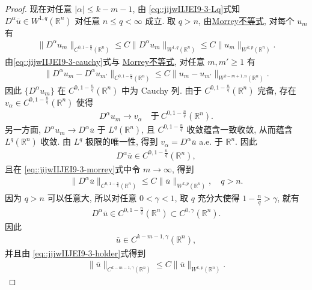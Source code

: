 \documentclass[../../main.tex]{subfiles}
\begin{document}
\begin{proof}
现在对任意 $|\alpha|\leqslant k-m-1$, 由 \eqref{eq::jijwIIJEI9-3-Lq}式知 $D^{\alpha}\overline{u}\in W^{1,q}(\mathbb{R}^{n})$ 对任意 $n\leqslant q<\infty$ 成立. 取 $q>n$, 由\hyperref[theorem:Morrey不等式]{Morrey不等式}, 对每个 $u_{m}$ 有
\begin{align}\label{eq::jijwIIJEI9-3-morrey}
\|D^{\alpha}u_{m}\|_{C^{0,1-\frac{n}{q}}(\mathbb{R}^{n})}\leqslant C\|D^{\alpha}u_{m}\|_{W^{1,q}(\mathbb{R}^{n})}\leqslant C\|u_{m}\|_{W^{k,p}(\mathbb{R}^{n})}.
\end{align}
由\eqref{eq::jijwIIJEI9-3-cauchy}式与 \hyperref[theorem:Morrey不等式]{Morrey不等式}, 对任意 $m,m'\geqslant1$ 有
\begin{align*}
\|D^{\alpha}u_{m}-D^{\alpha}u_{m'}\|_{C^{0,1-\frac{n}{q}}(\mathbb{R}^{n})}\leqslant C\|u_{m}-u_{m'}\|_{W^{k-m+1,n}(\mathbb{R}^{n})}.
\end{align*}
因此 $\{D^{\alpha}u_{m}\}$ 在 $C^{0,1-\frac{n}{q}}(\mathbb{R}^{n})$ 中为 Cauchy 列. 由于 $C^{0,1-\frac{n}{q}}(\mathbb{R}^{n})$ 完备, 存在 $v_{\alpha}\in C^{0,1-\frac{n}{q}}(\mathbb{R}^{n})$ 使得
\begin{align*}
D^{\alpha}u_{m}\to v_{\alpha}\quad\text{于}\ C^{0,1-\frac{n}{q}}(\mathbb{R}^{n}).
\end{align*}
另一方面, $D^{\alpha}u_{m}\to D^{\alpha}\overline{u}$ 于 $L^{q}(\mathbb{R}^{n})$, 且 $C^{0,1-\frac{n}{q}}$ 收敛蕴含一致收敛, 从而蕴含 $L^{q}(\mathbb{R}^{n})$ 收敛. 由 $L^{q}$ 极限的唯一性, 得到 $v_{\alpha}=D^{\alpha}\overline{u}$ a.e. 于 $\mathbb{R}^{n}$. 因此
\begin{align*}
D^{\alpha}\overline{u}\in C^{0,1-\frac{n}{q}}(\mathbb{R}^{n}),
\end{align*}
且在 \eqref{eq::jijwIIJEI9-3-morrey}式中令 $m\to\infty$, 得到
\begin{align}\label{eq::jijwIIJEI9-3-holder}
\|D^{\alpha}\overline{u}\|_{C^{0,1-\frac{n}{q}}(\mathbb{R}^{n})}\leqslant C\|\overline{u}\|_{W^{k,p}(\mathbb{R}^{n})},\quad q>n.
\end{align}
因为 $q>n$ 可以任意大, 所以对任意 $0<\gamma<1$, 取 $q$ 充分大使得 $1-\frac{n}{q}>\gamma$, 就有
\begin{align*}
D^{\alpha}\overline{u}\in C^{0,1-\frac{n}{q}}(\mathbb{R}^{n})\subset C^{0,\gamma}(\mathbb{R}^{n}).
\end{align*}
因此
\begin{align*}
\overline{u}\in C^{k-m-1,\gamma}(\mathbb{R}^{n}),
\end{align*}
并且由 \eqref{eq::jijwIIJEI9-3-holder}式得到
\begin{align}\label{eq::jijwIIJEI9-3-final}
\|\overline{u}\|_{C^{k-m-1,\gamma}(\mathbb{R}^{n})}\leqslant C\|\overline{u}\|_{W^{k,p}(\mathbb{R}^{n})}.
\end{align}


\end{proof}
\end{document}
